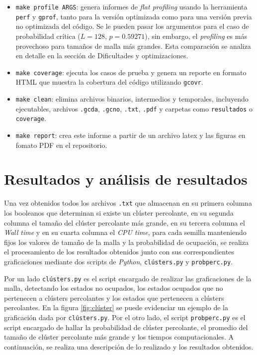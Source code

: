 \documentclass[%
 reprint,
 amsmath,amssymb,
 aps,
]{revtex4-2}
\begin{document}
\begin{itemize}
    \item \texttt{make profile ARGS}: genera informes de \textit{flat profiling} usando la herramienta \texttt{perf}\cite{perf} y \texttt{gprof}\cite{gprof}, tanto para la versión optimizada como para una versión previa no optimizada del código. Se le pueden pasar los argumentos para el caso de probabilidad crítica (\( L = 128 \), \( p = 0.59271 \)), sin embargo, el \textit{profiling} es más provechoso para tamaños de malla más grandes. Esta comparación se analiza en detalle en la sección de Dificultades y optimizaciones.
    
    \item \texttt{make coverage}: ejecuta los casos de prueba y genera un reporte en formato HTML que muestra la cobertura del código utilizando \texttt{gcovr}\cite{gcovr}.
    
    \item \texttt{make clean}: elimina archivos binarios, intermedios y temporales, incluyendo ejecutables, archivos \texttt{.gcda}, \texttt{.gcno}, \texttt{.txt}, \texttt{.pdf} y carpetas como \texttt{resultados} o \texttt{coverage}.

    \item \texttt{make report}: crea este informe a partir de un archivo latex y las figuras en fomato PDF en el repositorio.
    
\end{itemize}

\section{Resultados y análisis de resultados}

Una vez obtenidos todos los archivos \texttt{.txt} que almacenan en su primera columna los booleanos que determinan si existe un clúster percolante, en su segunda columna el tamaño del clúster percolante más grande, en su tercera columna el \textit{Wall time} y en su cuarta columna el \textit{CPU time}, para cada semilla manteniendo fijos los valores de tamaño de la malla y la probabilidad de ocupación, se realiza el procesamiento de los resultados obtenidos junto con sus correspondientes graficaciones mediante dos scripts de \textit{Python}, \texttt{clústers.py} y \texttt{probperc.py}.
\vspace{0.2 cm}

Por un lado \texttt{clústers.py} es el script encargado de realizar las graficaciones de la malla, detectando los estados no ocupados, los estados ocupados que no pertenecen a clústers percolantes y los estados que pertenecen a clústers percolantes. En la figura \ref{fig:clúster} se puede evidenciar un ejemplo de la graficación dada por \texttt{clústers.py}. Por el otro lado, el script \texttt{probperc.py} es el script encargado de hallar la probabilidad de clúster percolante, el promedio del tamaño de clúster percolante más grande y los tiempos computacionales. A continuación, se realiza una descripción de lo realizado y los resultados obtenidos.
\end{document}
